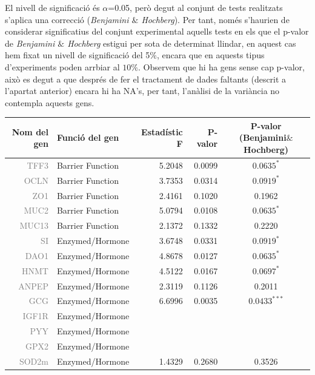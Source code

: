 \documentclass[english]{article}
\begin{document}
\noindent El nivell de significació és $\alpha$=0.05, però degut al conjunt de tests realitzats s'aplica una correcció (\textit{Benjamini $\&$ Hochberg}). Per tant, només s'haurien de considerar significatius del conjunt experimental aquells tests en els que el p-valor de \textit{Benjamini $\&$ Hochberg} estigui per sota de determinat llindar, en aquest cas hem fixat un nivell de significació del 5$\%$, encara que en aquests tipus d'experiments poden arrbiar al $10\%$. Observem que hi ha gens sense cap p-valor, això es degut a que després de fer el tractament de dades faltants (descrit a l'apartat anterior) encara hi ha NA's, per tant, l'anàlisi de la variància no contempla aquests gens.
\onecolumn
\begin{table}[ht]
\centering
\begin{tabular}{rlrrc}
  \toprule
 {\textbf{Nom del gen}} & {\textbf{Funció del gen }} & {\textbf{Estadístic F}} & {\textbf{P-valor}} & {\textbf{P-valor (Benjamini$\&$Hochberg)}} \\
  \midrule
{\textcolor{gray}{TFF3}} & Barrier Function & 5.2048 & 0.0099 & $0.0635^{*}$  \\
  {\textcolor{gray}{OCLN}} & Barrier Function & 3.7353 & 0.0314 & $0.0919^{*}$  \\
  {\textcolor{gray}{ZO1}} & Barrier Function & 2.4161 & 0.1020 & 0.1962 \\
  {\textcolor{gray}{MUC2}} & Barrier Function & 5.0794 & 0.0108 & $0.0635^{*}$  \\
  {\textcolor{gray}{MUC13}} & Barrier Function & 2.1372 & 0.1332 & 0.2220 \\
  {\textcolor{gray}{SI}} & Enzymed/Hormone & 3.6748 & 0.0331 & $0.0919^{*}$  \\
  {\textcolor{gray}{DAO1}} & Enzymed/Hormone & 4.8678 & 0.0127 & $0.0635^{*}$  \\
  {\textcolor{gray}{HNMT}} & Enzymed/Hormone & 4.5122 & 0.0167 & $0.0697^{*}$  \\
  {\textcolor{gray}{ANPEP}} & Enzymed/Hormone & 2.3119 & 0.1126 & 0.2011 \\
  {\textcolor{gray}{GCG}} & Enzymed/Hormone & 6.6996 & 0.0035 & $0.0433^{***}$ \\
  {\textcolor{gray}{IGF1R}} & Enzymed/Hormone &  &  &  \\
  {\textcolor{gray}{PYY}} & Enzymed/Hormone &  &  &  \\
  {\textcolor{gray}{GPX2}} & Enzymed/Hormone &  &  &  \\
  {\textcolor{gray}{SOD2m}} & Enzymed/Hormone & 1.4329 & 0.2680 & 0.3526 \\

\end{tabular}
\end{table}
\end{document}
